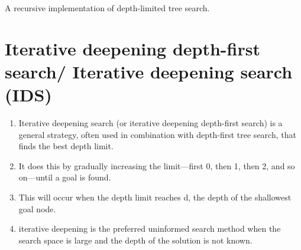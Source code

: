 \begin{algorithm}[H]
\caption{A recursive implementation of depth-limited tree search.}


\end{algorithm}


\section{Iterative deepening depth-first search/ Iterative deepening search (IDS) \cite{aci-1}} \label{Iterative deepening depth-first search/ Iterative deepening search (IDS)}

\begin{enumerate}
    \item Iterative deepening search (or iterative deepening depth-first search) is a general strategy, often used in combination with depth-first tree search, that finds the best depth limit. 
    
    \item It does this by gradually increasing the limit—first 0, then 1, then 2, and so on—until a goal is found.
    
    \item This will occur when the depth limit reaches d, the depth of the shallowest goal node.

    \item iterative deepening is the preferred uninformed search method when the search space is large and the depth of the solution is not known.
\end{enumerate}

